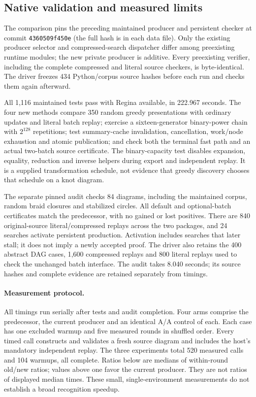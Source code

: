 \subsection{Native validation and measured limits}

The comparison pins the preceding maintained producer and persistent checker
at commit \texttt{4360509f450e} (the full hash is in each data file). Only the
existing producer selector and compressed-search dispatcher differ among
preexisting runtime modules; the new private producer is additive. Every
preexisting verifier, including the complete compressed and literal source
checkers, is byte-identical. The driver freezes 434 Python/corpus source
hashes before each run and checks them again afterward.

All 1,116 maintained tests pass with Regina available, in 222.967 seconds.
The four new methods compare 350 random greedy presentations with ordinary
updates and literal batch replay; exercise a sixteen-generator binary-power
chain with $2^{128}$ repetitions; test summary-cache invalidation, cancellation,
work/node exhaustion and atomic publication; and check both the terminal
fast path and an actual two-batch source certificate. The binary-capacity test
disables expansion, equality, reduction and inverse helpers during export
and independent replay. It is a supplied transformation schedule, not evidence
that greedy discovery chooses that schedule on a knot diagram.

The separate pinned audit checks 84 diagrams, including the maintained corpus,
random braid closures and stabilized circles. All default and optional-batch
certificates match the predecessor, with no gained or lost positives. There
are 840 original-source literal/compressed replays across the two packages,
and 24 searches activate persistent production. Activation includes searches
that later stall; it does not imply a newly accepted proof. The driver also
retains the 400 abstract DAG cases, 1,600 compressed replays and 800 literal
replays used to check the unchanged batch interface. The audit takes 8.040
seconds; its source hashes and complete evidence are retained separately
from timings.

\paragraph{Measurement protocol.}
All timings run serially after tests and audit completion. Four arms comprise
the predecessor, the current producer and an identical A/A control of each.
Each case has one excluded warmup and five measured rounds in shuffled order.
Every timed call constructs and validates a fresh source diagram and includes
the host's mandatory independent replay. The three experiments total 520
measured calls and 104 warmups, all complete. Ratios below are medians of
within-round old/new ratios; values above one favor the current producer.
They are not ratios of displayed median times. These small, single-environment
measurements do not establish a broad recognition speedup.

